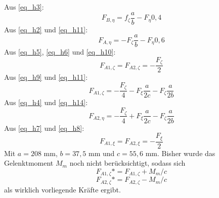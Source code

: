 Aus \ref{eq_h3}:
\begin{equation}\label{eq_h11}
	F_{B,\eta} = f_\zeta \frac{a}{b} - F_\eta 0,4
\end{equation}
Aus \ref{eq_h2} und \ref{eq_h11}:
\begin{equation}\label{eq_h12}
	F_{A, \eta} = -F_\zeta \frac{a}{b} - F_\eta 0,6
\end{equation}
Aus \ref{eq_h5}, \ref{eq_h6} und \ref{eq_h10}:
\begin{equation}\label{eq_h13}
	F_{A1, \zeta} = F_{A2, \zeta} = -\frac{F_\zeta}{2}
\end{equation}
Aus \ref{eq_h9} und \ref{eq_h11}:
\begin{equation}\label{eq_h14}
	F_{A1, \zeta} = -\frac{F_\zeta}{4}-F_\xi \frac{a}{2c}-F_\zeta \frac{a}{2b}
\end{equation}
Aus \ref{eq_h4} und \ref{eq_h14}:
\begin{equation}\label{eq_h15}
	F_{A2, \eta} = -\frac{F_\zeta}{4}+F_\xi \frac{a}{2c}-F_\zeta \frac{a}{2b}
\end{equation}
Aus \ref{eq_h7} und \ref{eq_h8}:
\begin{equation}\label{eq_h16}
F_{A1, \xi} = F_{A2, \xi} = -\frac{F_{\xi}}{2}
\end{equation}
Mit $a = 208$ mm, $b=37,5$ mm und $c = 55,6$ mm.
Bisher wurde das Gelenktmoment $M_m$ noch nicht berücksichtigt, sodass sich
\begin{equation}
	F_{A1,\zeta}* = F_{A1,\zeta} +M_m/c
\end{equation}
\begin{equation}
F_{A2,\zeta}* = F_{A2,\zeta} -M_m/c
\end{equation}
 als wirklich vorliegende Kräfte ergibt.